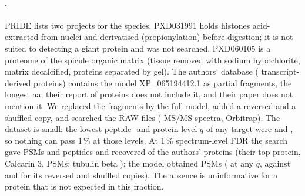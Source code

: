 \documentclass[11pt]{article}
\begin{document}
\paragraph{.} PRIDE lists two projects for the species. PXD031991 \citep{graubove2022} holds histones
acid-extracted from nuclei and derivatised (propionylation) before digestion; it is not suited to detecting a giant protein
and was not searched. PXD060105 \citep{voigt2025} is a proteome of the spicule organic matrix (tissue removed with sodium
hypochlorite, matrix decalcified, proteins separated by gel). The authors' database ( transcript-derived
proteins) contains the model XP\_065194412.1 as  partial fragments, the longest 
aa; their report of  proteins does not include it, and their paper does not mention it. We replaced the
fragments by the full model, added a reversed and a shuffled copy, and searched the  RAW files
( MS/MS spectra, Orbitrap). The dataset is small: the lowest peptide- and protein-level $q$ of any target were
 and , so nothing can pass 1\,\% at those levels. At 1\,\% spectrum-level FDR the search
gave  PSMs and  peptides and recovered  of the authors'
 proteins (their top protein, Calcarin 3,  PSMs; tubulin beta ); the model
obtained  PSMs ( at any $q$, against  and
 for its reversed and shuffled copies). The absence is uninformative for a protein that is not expected
in this fraction.

\begin{table}[ht]
\centering\scriptsize
\caption{Proteomics searches. PSMs and peptides at 1\,\% FDR (spectrum, peptide and protein level); $^{a}$PXD060105 at
spectrum level only, because the dataset cannot reach 1\,\% at the other levels. Last residue: end of the last unique
peptide on the giant (share of its length). Controls: PSMs of the reversed / shuffled giant at 1\,\% FDR.}\label{tab:prot}
\end{table}
\end{document}
